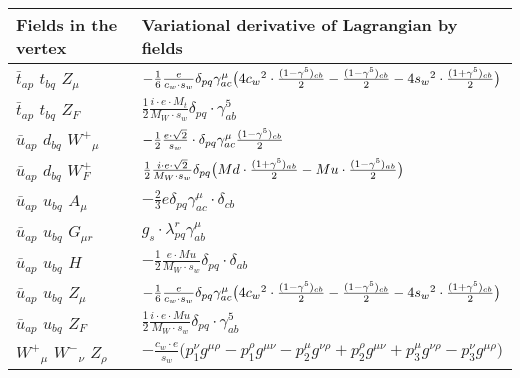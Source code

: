 \begin{center}
\begin{tabular}{|l|l|} \hline
Fields in the vertex & Variational derivative of Lagrangian by fields \\ \hline
$\bar{t}{}_{a p }$ \phantom{-} $t{}_{b q }$ \phantom{-} ${Z}_{\mu }$ \phantom{-}  &
	$-\frac{1}{6}\frac{ e}{ c_w \cdot s_w}\delta_{p q} \gamma_{a c}^\mu \big(4 c_w{}^2 \cdot {(1-\gamma^5)_{c b}\over 2} -{(1-\gamma^5)_{c b}\over 2} -4 s_w{}^2 \cdot {(1+\gamma^5)_{c b}\over 2} \big)$\\[2mm]
$\bar{t}{}_{a p }$ \phantom{-} $t{}_{b q }$ \phantom{-} $Z_F{}_{}$ \phantom{-}  &
	$\frac{1}{2}\frac{ i \cdot e \cdot M_t}{ M_W \cdot s_w}\delta_{p q} \cdot \gamma_{a b}^5 $\\[2mm]
$\bar{u}{}_{a p }$ \phantom{-} $d{}_{b q }$ \phantom{-} $W^+{}_{\mu }$ \phantom{-}  &
	$-\frac{1}{2}\frac{ e \cdot\sqrt{2}}{ s_w}\cdot \delta_{p q} \gamma_{a c}^\mu {(1-\gamma^5)_{c b}\over 2} $\\[2mm]
$\bar{u}{}_{a p }$ \phantom{-} $d{}_{b q }$ \phantom{-} $W^+_F{}_{}$ \phantom{-}  &
	$\frac{1}{2}\frac{ i \cdot e \cdot\sqrt{2}}{ M_W \cdot s_w}\delta_{p q} \big( Md\cdot {(1+\gamma^5)_{a b}\over 2} - Mu\cdot {(1-\gamma^5)_{a b}\over 2} \big)$\\[2mm]
$\bar{u}{}_{a p }$ \phantom{-} $u{}_{b q }$ \phantom{-} ${A}_{\mu }$ \phantom{-}  &
	$-\frac{2}{3} e\delta_{p q} \gamma_{a c}^\mu \cdot \delta_{c b} $\\[2mm]
$\bar{u}{}_{a p }$ \phantom{-} $u{}_{b q }$ \phantom{-} ${G}_{\mu r }$ \phantom{-}  &
	$ g_s\cdot \lambda_{p q}^r \gamma_{a b}^\mu $\\[2mm]
$\bar{u}{}_{a p }$ \phantom{-} $u{}_{b q }$ \phantom{-} ${H}_{}$ \phantom{-}  &
	$-\frac{1}{2}\frac{ e \cdot Mu}{ M_W \cdot s_w}\delta_{p q} \cdot \delta_{a b} $\\[2mm]
$\bar{u}{}_{a p }$ \phantom{-} $u{}_{b q }$ \phantom{-} ${Z}_{\mu }$ \phantom{-}  &
	$-\frac{1}{6}\frac{ e}{ c_w \cdot s_w}\delta_{p q} \gamma_{a c}^\mu \big(4 c_w{}^2 \cdot {(1-\gamma^5)_{c b}\over 2} -{(1-\gamma^5)_{c b}\over 2} -4 s_w{}^2 \cdot {(1+\gamma^5)_{c b}\over 2} \big)$\\[2mm]
$\bar{u}{}_{a p }$ \phantom{-} $u{}_{b q }$ \phantom{-} $Z_F{}_{}$ \phantom{-}  &
	$\frac{1}{2}\frac{ i \cdot e \cdot Mu}{ M_W \cdot s_w}\delta_{p q} \cdot \gamma_{a b}^5 $\\[2mm]
$W^+{}_{\mu }$ \phantom{-} $W^-{}_{\nu }$ \phantom{-} ${Z}_{\rho }$ \phantom{-}  &
	$-\frac{ c_w \cdot e}{ s_w}\big(p_1^\nu g^{\mu \rho} -p_1^\rho g^{\mu \nu} -p_2^\mu g^{\nu \rho} +p_2^\rho g^{\mu \nu} +p_3^\mu g^{\nu \rho} -p_3^\nu g^{\mu \rho} \big)$\\[2mm]

\end{tabular}
\end{center}
